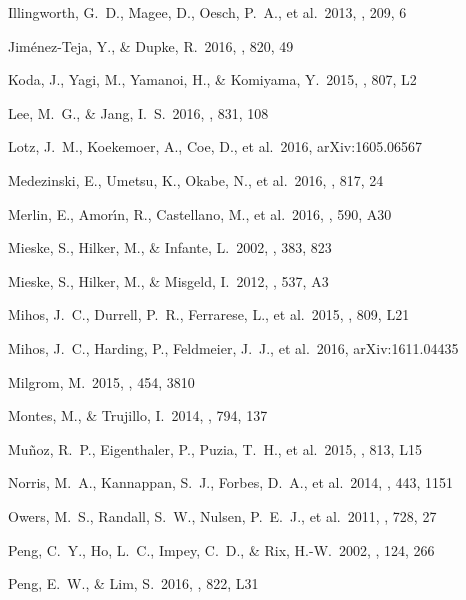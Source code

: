 \documentclass[iop,tighten,twocolumn,apj]{emulateapj}
\begin{document}
\begin{thebibliography}{}
 Illingworth, G.~D.,
Magee, D., Oesch, P.~A., et al.\ 2013, \apjs, 209, 6

Jim{\'e}nez-Teja, Y., \& Dupke, R.\ 2016, \apj, 820, 49

 Koda, J., Yagi, M., Yamanoi,
H., \& Komiyama, Y.\ 2015, \apjl, 807, L2

 Lee, M.~G., \& Jang, I.~S.\ 2016, \apj,
831, 108

 Lotz, J.~M., Koekemoer, A., Coe, D., et
al.\ 2016, arXiv:1605.06567 

 Medezinski, E., Umetsu,
K., Okabe, N., et al.\ 2016, \apj, 817, 24

 Merlin, E., Amor{\'{\i}}n,
R., Castellano, M., et al.\ 2016, \aap, 590, A30 

 Mieske, S., Hilker, M., \&
Infante, L.\ 2002, \aap, 383, 823

 Mieske, S., Hilker, M., \&
Misgeld, I.\ 2012, \aap, 537, A3

 Mihos, J.~C., Durrell,
P.~R., Ferrarese, L., et al.\ 2015, \apjl, 809, L21

 Mihos, J.~C., Harding, P.,
Feldmeier, J.~J., et al.\ 2016, arXiv:1611.04435

 Milgrom, M.\ 2015, \mnras, 454,
3810

 Montes, M., \&
Trujillo, I.\ 2014, \apj, 794, 137

 Mu{\~n}oz, R.~P., Eigenthaler, P.,
Puzia, T.~H., et al.\ 2015, \apjl, 813, L15

 Norris, M.~A., Kannappan,
S.~J., Forbes, D.~A., et al.\ 2014, \mnras, 443, 1151

 Owers, M.~S., Randall,
S.~W., Nulsen, P.~E.~J., et al.\ 2011, \apj, 728, 27

 Peng, C.~Y., Ho, L.~C., Impey, C.~D., \&
Rix, H.-W.\ 2002, \aj, 124, 266

 Peng, E.~W., \& Lim, S.\
2016, \apjl, 822, L31


\end{thebibliography}
\end{document}
